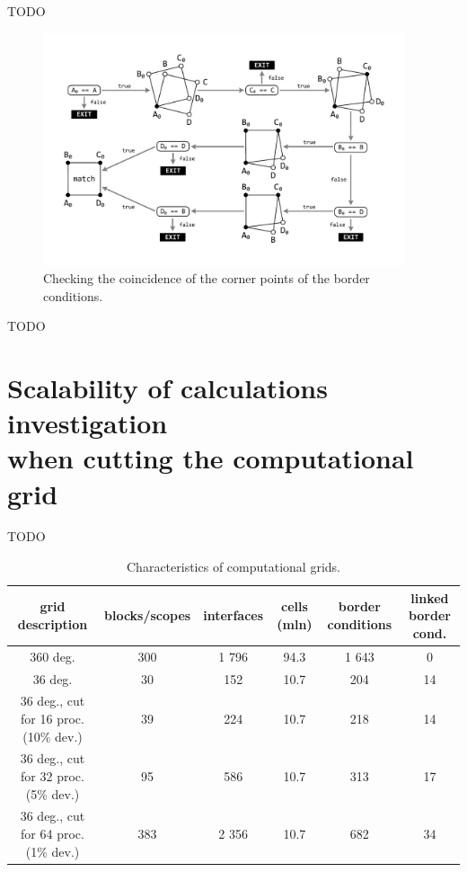 \documentclass[
11pt,%
tightenlines,%
twoside,%
onecolumn,%
nofloats,%
nobibnotes,%
nofootinbib,%
superscriptaddress,%
noshowpacs,%
centertags]%
{revtex4}
\begin{document}
TODO

\begin{figure}[h]
\setcaptionmargin{5mm}
\onelinecaptionstrue
\includegraphics[width=0.95\textwidth]{pics/match2.pdf}
\caption{Checking the coincidence of the corner points of the border conditions.}
\label{fig:match2}
\end{figure}

TODO
        
\section{Scalability of calculations investigation \protect\\ when cutting the computational grid}

TODO

\begin{table}[!h]
\setcaptionmargin{0mm}
\onelinecaptionsfalse
{}
\caption{Characteristics of computational grids.}
\bigskip
\begin{tabular}{|c|c|c|c|c|c|}
\hline
grid description & blocks/scopes & interfaces & cells (mln) & border conditions & linked border cond. \\
\hline
360 deg. & 300 & 1 796 & 94.3 & 1 643 & 0 \\
36 deg. & 30 & 152 & 10.7 & 204 & 14 \\
36 deg., cut for 16 proc. (10\% dev.) & 39 & 224 & 10.7 & 218 & 14 \\
36 deg., cut for 32 proc. (5\% dev.) & 95 & 586 & 10.7 & 313 & 17 \\
36 deg., cut for 64 proc. (1\% dev.) & 383 & 2 356 & 10.7 & 682 & 34 \\
\hline
\end{tabular}
\label{tab:grids}
\end{table}
\end{document}
